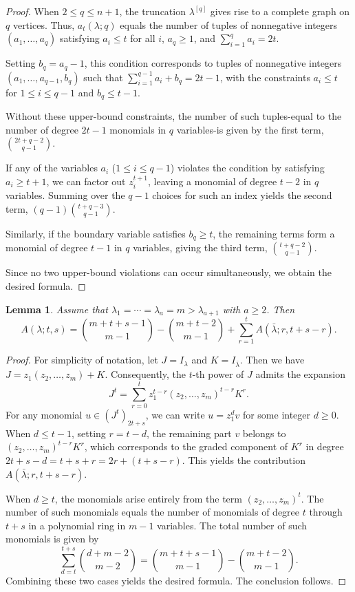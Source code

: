 \documentclass[12pt,amscd]{amsart}
\newtheorem{lem}[thm]{Lemma}
\theoremstyle{definition}
\numberwithin{equation}{section}
\begin{document}
\begin{proof} 
When $2 \le q \le n + 1$, the truncation $\lambda^{[q]}$ gives rise to a complete graph on $q$ vertices. Thus, $a_t(\lambda; q)$ equals the number of tuples of nonnegative integers $(a_1, \ldots, a_q)$ satisfying $a_i \le t$ for all $i$, $a_q \ge 1$, and $\sum_{i=1}^q a_i = 2t$. 

Setting $b_q = a_q - 1$, this condition corresponds to tuples of nonnegative integers $(a_1, \ldots, a_{q-1}, b_q)$ such that $\sum_{i=1}^{q-1} a_i + b_q = 2t - 1$, with the constraints $a_i \le t$ for $1 \le i \le q-1$ and $b_q \le t - 1$. 

Without these upper-bound constraints, the number of such tuples-equal to the number of degree $2t - 1$ monomials in $q$ variables-is given by the first term, $\binom{2t + q - 2}{q - 1}$. 

If any of the variables $a_i$ ($1 \le i \le q-1$) violates the condition by satisfying $a_i \ge t + 1$, we can factor out $z_i^{t+1}$, leaving a monomial of degree $t - 2$ in $q$ variables. Summing over the $q-1$ choices for such an index yields the second term, $(q - 1)\binom{t + q - 3}{q - 1}$. 

Similarly, if the boundary variable satisfies $b_q \ge t$, the remaining terms form a monomial of degree $t - 1$ in $q$ variables, giving the third term, $\binom{t + q - 2}{q - 1}$. 

Since no two upper-bound violations can occur simultaneously, we obtain the desired formula.
\end{proof}

\begin{lem}\label{lem_a_3}
Assume that $\lambda_1 = \cdots = \lambda_a = m > \lambda_{a+1}$ with $a \ge 2$. Then 
\[
A(\lambda; t, s) = \binom{m + t + s - 1}{m - 1} - \binom{m + t - 2}{m - 1} + \sum_{r=1}^t A(\bar{\lambda}; r, t + s - r).
\]
\end{lem}

\begin{proof}
For simplicity of notation, let $J = I_\lambda$ and $K = I_{\bar{\lambda}}$. Then we have $J = z_1(z_2, \ldots, z_m) + K$. Consequently, the $t$-th power of $J$ admits the expansion
\[
J^t = \sum_{r=0}^t z_1^{t-r} (z_2, \ldots, z_m)^{t-r} K^r.
\]
For any monomial $u \in (J^t)_{2t+s}$, we can write $u = z_1^d v$ for some integer $d \ge 0$. When $d \le t-1$, setting $r = t-d$, the remaining part $v$ belongs to $(z_2, \ldots, z_m)^{t-r} K^r$, which corresponds to the graded component of $K^r$ in degree $2t + s - d = t + s + r = 2r + (t + s - r)$. This yields the contribution $A(\bar{\lambda}; r, t + s - r)$. 

When $d \ge t$, the monomials arise entirely from the term $(z_2, \ldots, z_m)^t$. The number of such monomials equals the number of monomials of degree $t$ through $t+s$ in a polynomial ring in $m-1$ variables. The total number of such monomials is given by
\[
\sum_{d = t}^{t+s} \binom{d+m-2}{m-2} = \binom{m + t + s - 1}{m - 1} - \binom{m + t - 2}{m - 1}.
\]
Combining these two cases yields the desired formula. The conclusion follows.
\end{proof}
\end{document}
